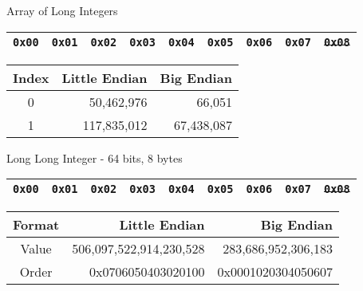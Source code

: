 \documentclass{beamer}
\begin{document}
\begin{frame}{Array of Long Integers}

\begin{table}[]
\begin{tabular}{|l|l|l|l|l|l|l|l|l|}
\hline
 \color{red}\texttt{0x00} & \color{red}\texttt{0x01} & \color{red}\texttt{0x02} & \color{red}\texttt{0x03} & \color{blue}\texttt{0x04} & \color{blue}\texttt{0x05} & \color{blue}\texttt{0x06} & \color{blue}\texttt{0x07} &
 \sout{\texttt{0x08}} \\
\hline 
\end{tabular}
\end{table}

\begin{table}[]
\begin{tabular}{c r r}
Index & Little Endian & Big Endian \\
\hline
  0 & 50,462,976 & 66,051 \\
  1 & 117,835,012  & 67,438,087
\end{tabular}
\end{table}

\end{frame}

\begin{frame}{Long Long Integer - 64 bits, 8 bytes}

\begin{table}[]
\begin{tabular}{|l|l|l|l|l|l|l|l|l|}
\hline
 \color{red}\texttt{0x00} & \color{red}\texttt{0x01} & \color{red}\texttt{0x02} & \color{red}\texttt{0x03} & \color{red}\texttt{0x04} & \color{red}\texttt{0x05} & \color{red}\texttt{0x06} & \color{red}\texttt{0x07} &
 \sout{\texttt{0x08}} \\
\hline 
\end{tabular}
\end{table}

\begin{table}[]
\begin{tabular}{c r r}
Format & Little Endian & Big Endian \\
\hline
Value &  506,097,522,914,230,528   & 283,686,952,306,183 \\
Order & 0x0706050403020100 & 0x0001020304050607
\end{tabular}
\end{table}

\end{frame}
\end{document}
